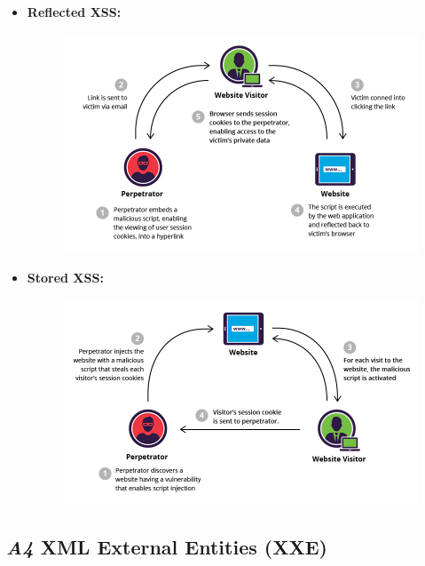 \documentclass[a5paper,pagesize,10pt,bibtotoc,DIV=10,twoside]{scrbook}
\begin{document}
\begin{itemize}
\item \textbf{Reflected XSS: }\cite{reflected-xss}
\begin{figure}[H]
\includegraphics[scale=0.35]{images/reflected-xss}
\end{figure}
\item \textbf{Stored XSS: }\cite{stored-xss}
\begin{figure}[H]
\includegraphics[scale=0.35]{images/xss}
\end{figure}
\end{itemize}


\subsection{\textit{A4}  \normalsize{XML External Entities (XXE)}}
\end{document}
